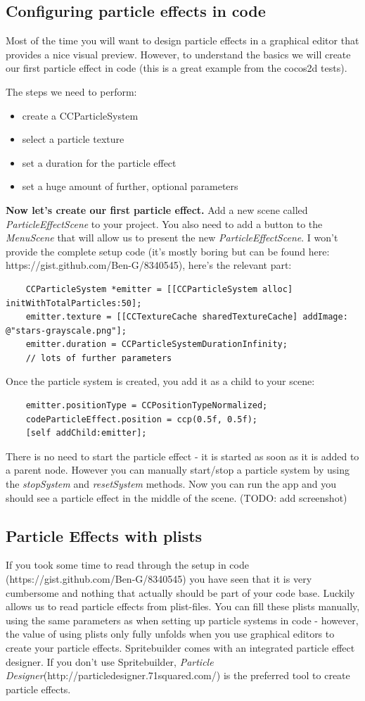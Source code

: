 \subsection{Configuring particle effects in code}
Most of the time you will want to design particle effects in a graphical editor
that provides a nice visual preview. However, to understand the basics we will
create our first particle effect in code (this is a great example from 
the cocos2d tests).

The steps we need to perform:
 \begin{itemize}
   \item create a CCParticleSystem
   \item select a particle texture
   \item set a duration for the particle effect
   \item set a huge amount of further, optional parameters
 \end{itemize}
\textbf{Now let's create our first particle effect.}
Add a new scene called \textit{ParticleEffectScene} to your project. You also
need to add a button to the \textit{MenuScene} that will allow us to present the
new \textit{ParticleEffectScene}.  
I won't provide the complete setup code (it's mostly
boring but can be found here: https://gist.github.com/Ben-G/8340545), here's the relevant part:
\begin{lstlisting}
    CCParticleSystem *emitter = [[CCParticleSystem alloc] initWithTotalParticles:50];
    emitter.texture = [[CCTextureCache sharedTextureCache] addImage: @"stars-grayscale.png"];
	emitter.duration = CCParticleSystemDurationInfinity;
    // lots of further parameters
\end{lstlisting}
Once the particle system is created, you add it as a child to your scene:
\begin{lstlisting}
    emitter.positionType = CCPositionTypeNormalized;
    codeParticleEffect.position = ccp(0.5f, 0.5f);
    [self addChild:emitter];
\end{lstlisting}
There is no need to start the particle effect - it is started as soon as it is
added to a parent node. However you can manually start/stop a particle system by
using the \textit{stopSystem} and \textit{resetSystem} methods. Now you can run
the app and you should see a particle effect in the middle of the scene. (TODO:
add screenshot) 
\subsection{Particle Effects with plists}
If you took some time to read through the setup in code
(https://gist.github.com/Ben-G/8340545) you have seen that it is very cumbersome
and nothing that actually should be part of your code base. Luckily \cocos{}
allows us to read particle effects from plist-files. You can fill these plists
manually, using the same parameters as when setting up particle systems in code
- however, the value of using plists only fully unfolds when you use graphical
editors to create your particle effects. Spritebuilder comes with an integrated
particle effect designer. If you don't use Spritebuilder, \textit{Particle
Designer}(http://particledesigner.71squared.com/) is the preferred tool to
create particle effects.
